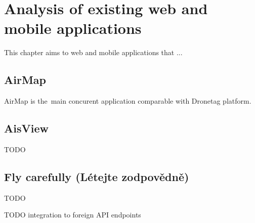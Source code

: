 \chapter{Analysis of existing web and mobile applications}\label{ch:analysis-of-existing-web-and-mobile-applications}

This chapter aims to web and mobile applications that ...

\section{AirMap}\label{sec:airmap}
AirMap is the~main concurent application comparable with Dronetag platform.%

\section{AisView}\label{sec:aisview}
TODO

\section{Fly carefully (L{\' e}tejte zodpov{\v e}dn{\v e})}\label{sec:fly-carefully}
TODO


TODO integration to foreign API endpoints

